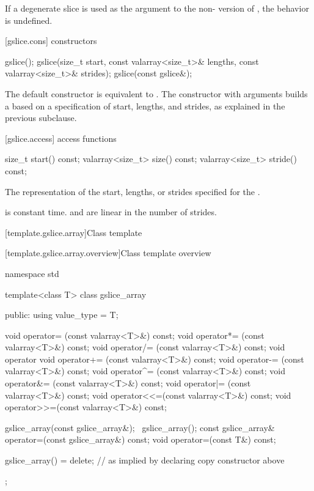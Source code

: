 \pnum
If a degenerate slice is used as the argument to the
non-
version of
,
the behavior is undefined.
%

[gslice.cons]{ constructors}

%
\begin{itemdecl}
gslice();
gslice(size_t start, const valarray<size_t>& lengths,
         const valarray<size_t>& strides);
gslice(const gslice&);
\end{itemdecl}

\begin{itemdescr}
\pnum
The default constructor is equivalent to
.
The constructor with arguments builds a
based on a specification of start, lengths, and strides, as explained
in the previous subclause.
\end{itemdescr}

[gslice.access]{ access functions}

%
%
%
\begin{itemdecl}
size_t           start()  const;
valarray<size_t> size() const;
valarray<size_t> stride() const;
\end{itemdecl}

\begin{itemdescr}
\pnum
\returns The representation of the
start, lengths, or strides specified for the .

\pnum
\complexity {} is constant time.  and 
are linear in the number of strides.
\end{itemdescr}

[template.gslice.array]{Class template }

[template.gslice.array.overview]{Class template  overview}

%
%
\begin{codeblock}
namespace std {
  template<class T> class gslice_array {
  public:
    using value_type = T;

    void operator=  (const valarray<T>&) const;
    void operator*= (const valarray<T>&) const;
    void operator/= (const valarray<T>&) const;
    void operator%
    void operator+= (const valarray<T>&) const;
    void operator-= (const valarray<T>&) const;
    void operator^= (const valarray<T>&) const;
    void operator&= (const valarray<T>&) const;
    void operator|= (const valarray<T>&) const;
    void operator<<=(const valarray<T>&) const;
    void operator>>=(const valarray<T>&) const;

    gslice_array(const gslice_array&);
    ~gslice_array();
    const gslice_array& operator=(const gslice_array&) const;
    void operator=(const T&) const;

    gslice_array() = delete;      // as implied by declaring copy constructor above
  };
}
\end{codeblock}

